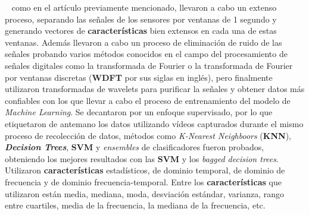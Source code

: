 		~ como en el artículo previamente mencionado, llevaron a cabo un extenso proceso, separando las señales de los
		sensores por ventanas de 1 segundo y generando vectores de \textbf{características} bien extensos en cada una de estas ventanas. Además llevaron
		a cabo un proceso de eliminación de ruido de las señales probando varios métodos conocidos en el campo del procesamiento de señales
		digitales como la transformada de Fourier o la transformada de Fourier por ventanas discretas (\textbf{WDFT} por sus siglas en inglés),
		pero finalmente utilizaron transformadas de wavelets para purificar la señales y obtener datos más confiables con los que llevar a cabo
		el proceso de entrenamiento del modelo de \emph{Machine Learning}. Se decantaron por un enfoque supervisado, por lo que etiquetaron de
		antemano los datos utilizando vídeos capturados durante el mismo proceso de recolección de datos, métodos como \emph{K-Nearest Neighboors}
		(\textbf{KNN}), \emph{\textbf{Decision Trees}}, \textbf{SVM} y \emph{ensembles} de clasificadores fueron probados, obteniendo los mejores
		resultados con las \textbf{SVM} y los \emph{bagged decision trees}. Utilizaron \textbf{características} estadísticos, de dominio temporal, de dominio
		de frecuencia y de dominio frecuencia-temporal. Entre los \textbf{características} que utilizaron están media, mediana, moda, desviación estándar,
		varianza, rango entre cuartiles, media de la frecuencia, la mediana de la frecuencia, etc.\\



